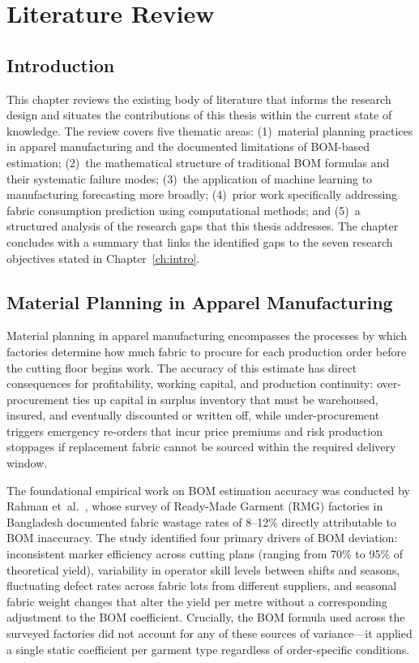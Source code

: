 \chapter{Literature Review}
\label{ch:lit}
\sloppy
{}

\section{Introduction}
This chapter reviews the existing body of literature that informs the research design and situates the contributions of this thesis within the current state of knowledge. The review covers five thematic areas: (1)~material planning practices in apparel manufacturing and the documented limitations of BOM-based estimation; (2)~the mathematical structure of traditional BOM formulas and their systematic failure modes; (3)~the application of machine learning to manufacturing forecasting more broadly; (4)~prior work specifically addressing fabric consumption prediction using computational methods; and (5)~a structured analysis of the research gaps that this thesis addresses. The chapter concludes with a summary that links the identified gaps to the seven research objectives stated in Chapter~\ref{ch:intro}.

\secdiv
\section{Material Planning in Apparel Manufacturing}
Material planning in apparel manufacturing encompasses the processes by which factories determine how much fabric to procure for each production order before the cutting floor begins work. The accuracy of this estimate has direct consequences for profitability, working capital, and production continuity: over-procurement ties up capital in surplus inventory that must be warehoused, insured, and eventually discounted or written off, while under-procurement triggers emergency re-orders that incur price premiums and risk production stoppages if replacement fabric cannot be sourced within the required delivery window.

The foundational empirical work on BOM estimation accuracy was conducted by Rahman et~al.\ \cite{rahman2018fabric}, whose survey of Ready-Made Garment (RMG) factories in Bangladesh documented fabric wastage rates of 8--12\% directly attributable to BOM inaccuracy. The study identified four primary drivers of BOM deviation: inconsistent marker efficiency across cutting plans (ranging from 70\% to 95\% of theoretical yield), variability in operator skill levels between shifts and seasons, fluctuating defect rates across fabric lots from different suppliers, and seasonal fabric weight changes that alter the yield per metre without a corresponding adjustment to the BOM coefficient. Crucially, the BOM formula used across the surveyed factories did not account for any of these sources of variance---it applied a single static coefficient per garment type regardless of order-specific conditions.

